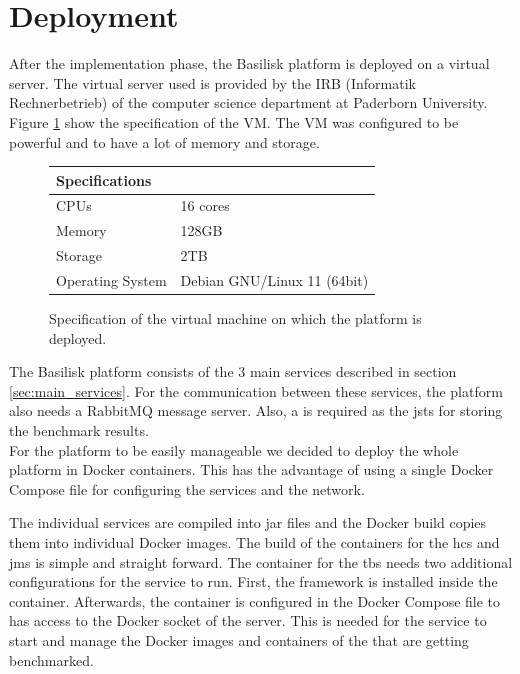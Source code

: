 \section{Deployment}
\label{sec:deployment}
After the implementation phase, the Basilisk platform is deployed on a virtual server.
The virtual server used is provided by the IRB (Informatik Rechnerbetrieb) of the computer science department at Paderborn University.
Figure \ref{fig:vm_specs} show the specification of the VM.
The VM was configured to be powerful and to have a lot of memory and storage.

\begin{figure}[tbph]
	\centering
	\begin{tabular}{ll}
		\toprule
		\textbf{Specifications} &                             \\ \midrule
		CPUs                    & 16 cores                    \\ \midrule
		Memory                  & 128GB                       \\ \midrule
		Storage                 & 2TB                         \\ \midrule
		Operating System        & Debian GNU/Linux 11 (64bit) \\ \bottomrule
	\end{tabular}
	\caption{Specification of the virtual machine on which the platform is deployed.}
	\label{fig:vm_specs}
\end{figure}

The Basilisk platform consists of the 3 main services described in section \ref{sec:main_services}.
For the communication between these services, the platform also needs a RabbitMQ message server.
Also, a \ts{} is required as the \acl{jsts} for storing the benchmark results.
\\

For the platform to be easily manageable we decided to deploy the whole platform in Docker containers.
This has the advantage of using a single Docker Compose file for configuring the services and the network.

The individual services are compiled into jar files and the Docker build copies them into individual Docker images.
The build of the containers for the \ac{hcs} and \ac{jms} is simple and straight forward.
The container for the \ac{tbs} needs two additional configurations for the service to run.
First, the \iguana{} framework is installed inside the container.
Afterwards, the container is configured in the Docker Compose file to has access to the Docker socket of the server.
This is needed for the service to start and manage the Docker images and containers of the \tsp{} that are getting benchmarked.

